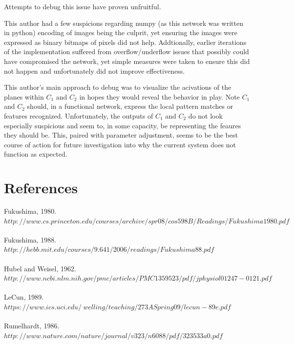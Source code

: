 \documentclass[12pt]{article}
\begin{document}
Attempts to debug this issue have proven unfruitful. 

This author had a few suspicions regarding numpy (as this network was written in python) encoding of images being the culprit, yet ensuring the images were expressed as binary bitmaps of pixels did not help. Addtionally, earlier iterations of the implementation suffered from overflow/underflow issues that possibly could have compromised the network, yet simple measures were taken to ensure this did not happen and unfortunately did not improve effectiveness.

This author's main approach to debug was to visualize the acivations of the planes within $C_1$ and $C_2$ in hopes they would reveal the behavior in play. Note $C_1$ and $C_2$ should, in a functional network, express the local pattern matches or features recognized. Unfortunately, the outputs of $C_1$ and $C_2$ do not look especially suspicious and seem to, in some capacity, be representing the feaures they should be. This, paired with parameter adjustment, seems to be the best course of action for future investigation into why the current system does not function as expected. 

\section{References}
Fukushima, 1980. \\
$http://www.cs.princeton.edu/courses/archive/spr08/cos598B/Readings/Fukushima1980.pdf$ \\\\
Fukushima, 1988. \\
$http://hebb.mit.edu/courses/9.641/2006/readings/Fukushima88.pdf$ \\\\
Hubel and Weisel, 1962. \\
$http://www.ncbi.nlm.nih.gov/pmc/articles/PMC1359523/pdf/jphysiol01247-0121.pdf$ \\\\
LeCun, 1989. \\
$https://www.ics.uci.edu/~welling/teaching/273ASpring09/lecun-89e.pdf$ \\\\
Rumelhardt, 1986. \\
$http://www.nature.com/nature/journal/v323/n6088/pdf/323533a0.pdf$ \\\\
\end{document}
